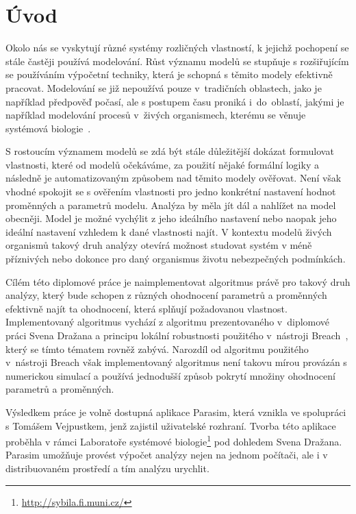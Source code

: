 \chapter{Úvod}\label{chapter:introduction}

Okolo nás se vyskytují různé systémy rozličných vlastností, k jejichž
pochopení se stále častěji používá modelování. Růst významu modelů se stupňuje
s rozšiřujícím se používáním výpočetní techniky, která je schopná s těmito modely
efektivně pracovat. Modelování se již nepoužívá pouze v~tradičních oblastech, jako je například
předpověď počasí, ale s postupem času proniká i~do~oblastí, jakými je například
modelování procesů v~živých organismech, kte\-ré\-mu se věnuje systémová biologie~\cite{westerhoff2005}.

S rostoucím významem modelů se zdá být stále důležitější dokázat formulovat
vlastnosti, které od modelů očekáváme, za použití nějaké for\-mál\-ní logiky a následně
je automatizovaným způsobem nad těmito modely o\-vě\-řo\-vat. Není však vhodné spokojit se s ověřením
vlastnosti pro jedno konkrétní nastavení hodnot proměnných a parametrů modelu. Analýza
by měla jít dál a nahlížet na model obecněji. Model je možné vychýlit z jeho ideálního
nastavení nebo naopak jeho ideální nastavení vzhledem k dané vlastnosti najít. V kontextu
modelů živých organismů takový druh analýzy otevírá možnost studovat systém v méně příznivých
nebo dokonce pro daný organismus životu nebezpečných podmínkách.

Cílém této diplomové práce je naimplementovat algoritmus právě pro takový druh analýzy,
který bude schopen z různých ohodnocení parametrů a proměnných efektivně najít ta ohodnocení,
která splňují požadovanou vlastnost. Implementovaný algoritmus vychází z algoritmu
prezentova\-né\-ho v~di\-plo\-mo\-vé práci Svena Dražana \cite{drazan2011} a principu lokální robustnosti použitého v~ná\-stro\-ji Breach~\cite{donze2010breach},
který se tímto té\-ma\-tem rovněž zabývá. Narozdíl od algoritmu pou\-ži\-té\-ho v~ná\-stro\-ji Breach však
implementovaný algoritmus není takovu mírou pro\-vá\-zán s numerickou simulací a používá
jednodušší způ\-sob pokrytí množiny ohodnocení parametrů a proměnných.

Výsledkem práce je volně dostupná aplikace Parasim, která vznikla ve spolupráci s Tomášem Vejpustkem,
jenž zajistil uživatelské rozhraní. Tvor\-ba této aplikace proběhla v rámci Laboratoře
systémové biologie\footnote{\url{http://sybila.fi.muni.cz/}} pod dohledem Svena Dražana.
Parasim umožňuje provést výpočet analýzy nejen na jednom počítači, ale i v distribuovaném
prostředí a tím analýzu urychlit.

